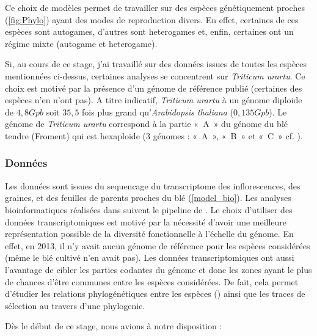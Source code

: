 \documentclass[../main]{subfiles} %
\begin{document}
Ce choix de modèles permet de travailler sur des espèces génétiquement proches (\cref{fig:Phylo}) ayant des modes de reproduction divers. En effet, certaines de ces espèces sont \glspl{autogame}, d’autres sont \glspl{heterogame} et, enfin, certaines ont un régime mixte (\gls{autogame} et \gls{heterogame}).

Si, au cours de ce stage, j’ai travaillé sur des données issues de toutes les espèces mentionnées ci-dessus,  certaines  analyses se concentrent sur \textit{Triticum urartu}. Ce choix est motivé par la présence d'un génome de référence publié (certaines des espèces n'en n'ont pas). A titre indicatif, \textit{Triticum urartu} à un génome \gls{diploide} de $4,8 Gpb$ soit $35,5$ fois plus grand qu'\textit{Arabidopsis thaliana} ($0,135 Gpb$). Le génome de \textit{Triticum urartu} correspond à la partie « A » du génome du blé tendre (Froment) qui est \gls{hexaploide} (3 génomes : « A », « B » et « C »  cf. \cite{noauthor_ble_2024}).


\subsubsection{Données}
\label{sec:donnees}



Les  données sont issues du \gls{sequencage} du \gls{transcriptome}
des \glspl{inflorescence}, des graines, et des feuilles de parents proches du blé (\cref{model_bio}). Les analyses bioinformatiques réalisées dans  \cite{burgarella_mating_2024} suivent le pipeline de \cite{sarah_large_2017}. 
Le choix d’utiliser des données \glspl{transcriptomique} est motivé par la nécessité d'avoir une meilleure représentation possible de la diversité fonctionnelle à l'échelle du génome. En effet, en 2013, il n'y avait aucun génome de référence pour les espèces considérées (même le blé cultivé n'en avait pas). Les données \glspl{transcriptomique} ont aussi l'avantage de cibler les parties codantes du génome et donc les zones ayant le plus de chances d’être communes entre les espèces considérées. De fait, cela permet d’étudier les relations phylogénétiques entre les espèces (\cite{glemin_pervasive_2019}) ainsi que les traces de sélection au travers d'une \gls{phylogenie}. 


Dès le début de ce stage, nous avions à notre disposition :
\end{document}
